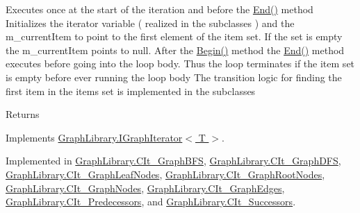 Executes once at the start of the iteration and before the \hyperlink{class_graph_library_1_1_abstract_graph_iterator_a77e657620d4949f79970ce536e0d2bde}{End()} method Initializes the iterator variable ( realized in the subclasses ) and the m\+\_\+current\+Item to point to the first element of the item set. If the set is empty the m\+\_\+current\+Item points to null. After the \hyperlink{class_graph_library_1_1_abstract_graph_iterator_acf5701dde84f76b34a8c2e1d49fa9597}{Begin()} method the \hyperlink{class_graph_library_1_1_abstract_graph_iterator_a77e657620d4949f79970ce536e0d2bde}{End()} method executes before going into the loop body. Thus the loop terminates if the item set is empty before ever running the loop body The transition logic for finding the first item in the items set is implemented in the subclasses 

\begin{DoxyReturn}{Returns}

\end{DoxyReturn}


Implements \hyperlink{interface_graph_library_1_1_i_graph_iterator}{Graph\+Library.\+I\+Graph\+Iterator$<$ T $>$}.



Implemented in \hyperlink{class_graph_library_1_1_c_it___graph_b_f_s_aa96b96be6229e08e45b85fcd0130445d}{Graph\+Library.\+C\+It\+\_\+\+Graph\+B\+F\+S}, \hyperlink{class_graph_library_1_1_c_it___graph_d_f_s_a0c5f16a80d9647af3bf1ad35507fe62a}{Graph\+Library.\+C\+It\+\_\+\+Graph\+D\+F\+S}, \hyperlink{class_graph_library_1_1_c_it___graph_leaf_nodes_a7f9ce52d3e6c908a50abc991f77b805d}{Graph\+Library.\+C\+It\+\_\+\+Graph\+Leaf\+Nodes}, \hyperlink{class_graph_library_1_1_c_it___graph_root_nodes_a582dd6795006075f6f81fef42d1de1ba}{Graph\+Library.\+C\+It\+\_\+\+Graph\+Root\+Nodes}, \hyperlink{class_graph_library_1_1_c_it___graph_nodes_a19eafdc8ea743803dddcc5a9a73adbf6}{Graph\+Library.\+C\+It\+\_\+\+Graph\+Nodes}, \hyperlink{class_graph_library_1_1_c_it___graph_edges_a5934153f52d3b0e5bc7de7dbcb3d454d}{Graph\+Library.\+C\+It\+\_\+\+Graph\+Edges}, \hyperlink{class_graph_library_1_1_c_it___predecessors_aa71033bdb63459cb6bac0c01db43bf6d}{Graph\+Library.\+C\+It\+\_\+\+Predecessors}, and \hyperlink{class_graph_library_1_1_c_it___successors_ab13b972da76d0f8972114e8d376ba68c}{Graph\+Library.\+C\+It\+\_\+\+Successors}.

\hypertarget{class_graph_library_1_1_abstract_graph_iterator_a77e657620d4949f79970ce536e0d2bde}{}

